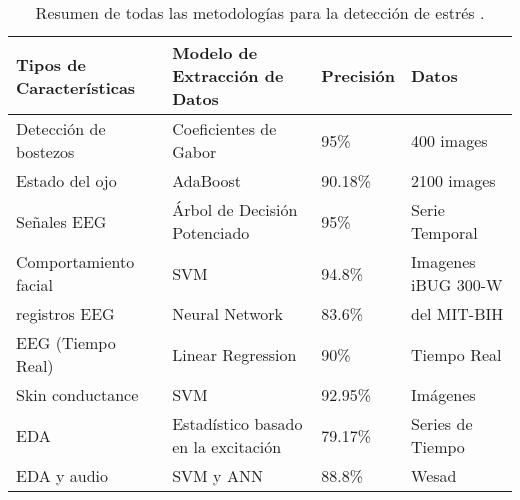 \begin{table}[h!]
    \centering
    \caption{Resumen de todas las metodologías para la detección de estrés .}
    \label{tab:metodologias}
    \begin{scriptsize} %
    \begin{tabular}{|l|l|l|l|}
    \hline
    \textbf{Tipos de Características} & \textbf{Modelo de Extracción de Datos} & \textbf{Precisión} & \textbf{Datos} \\ \hline
    
    Detección de bostezos            & Coeficientes de Gabor                                 & 95\%               & 400 images \cite{fan2007yawning}              \\ \hline
    
    Estado del ojo                    & AdaBoost                             & 90.18\%            &    2100 images \cite{wang2010novel}             \\ \hline
    
    Señales EEG                       & Árbol de Decisión Potenciado         & 95\%               &   Serie Temporal\cite{hu2018automated}            \\ \hline
    
    Comportamiento facial             & SVM                                  & 94.8\%             &     Imagenes iBUG 300-W\cite{carass}       \\ \hline
    
    registros EEG            & Neural Network                                  & 83.6\%             &  del MIT-BIH\cite{national2011fars}            \\ \hline
    
    EEG (Tiempo Real)              &Linear Regression                                 & 90\%             &       Tiempo Real         \\ \hline
    
    
    Skin conductance            &SVM                                 & 92.95\%             &  Imágenes  \cite{bundele2009svm}
               \\ \hline
    
    EDA             &Estadístico basado en  la excitación                                   & 79.17\%           &  Series de Tiempo               \\ \hline
    
    EDA y audio             &SVM y ANN                                   & 88.8\%           &   Wesad\cite{Schmidt2018IntroducingWA}               \\ \hline
    

\end{tabular}
\end{scriptsize}
\end{table}
